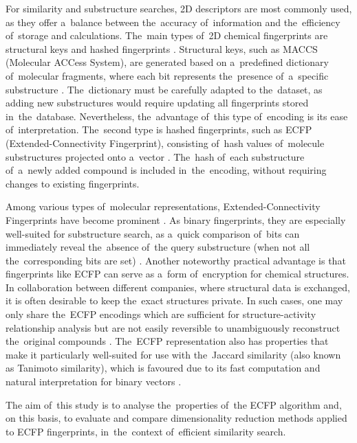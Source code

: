 For similarity and substructure searches, 2D descriptors are most commonly used, as they offer a~balance between the~accuracy of~information and the~efficiency of~storage and calculations. The~main types of~2D chemical fingerprints are structural keys and hashed fingerprints \cite{leach2007chemoinformatics}. Structural keys, such as MACCS (Molecular ACCess System), are generated based on a~predefined dictionary of~molecular fragments, where each bit represents the~presence of~a~specific substructure \cite{leach2007chemoinformatics}. The~dictionary must be carefully adapted to the~dataset, as adding new substructures would require updating all fingerprints stored in~the~database. Nevertheless, the~advantage of~this type of~encoding is its ease of~interpretation. The~second type is hashed fingerprints, such as ECFP (Extended-Connectivity Fingerprint), consisting of~hash values of~molecule substructures projected onto a~vector \cite{leach2007chemoinformatics}. The~hash of~each substructure of~a~newly added compound is included in~the~encoding, without requiring changes to existing fingerprints.

Among various types of~molecular representations, Extended-Connectivity Fingerprints have become prominent \cite{karthikeyan2014chemoinformatics, leach2007chemoinformatics}. As binary fingerprints, they are especially well-suited for substructure search, as a~quick comparison of~bits can immediately reveal the~absence of~the query substructure (when not all the~corresponding bits are set) \cite{leach2007chemoinformatics}. Another noteworthy practical advantage is that fingerprints like ECFP can serve as a~form of~encryption for chemical structures. In collaboration between different companies, where structural data is exchanged, it is often desirable to keep the~exact structures private. In such cases, one may only share the~ECFP encodings which are sufficient for structure-activity relationship analysis but are not easily reversible to unambiguously reconstruct the~original compounds \cite{le2020decipher}. The~ECFP representation also has properties that make it particularly well-suited for use with the~Jaccard similarity (also known as Tanimoto similarity), which is favoured due to its fast computation and natural interpretation for binary vectors \cite{karthikeyan2014chemoinformatics}.

The aim of~this study is to analyse the~properties of~the ECFP algorithm and, on this basis, to evaluate and compare dimensionality reduction methods applied to ECFP fingerprints, in~the~context of~efficient similarity search.